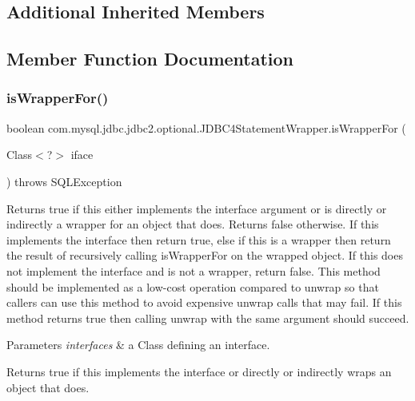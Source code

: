 \subsection*{Additional Inherited Members}


\subsection{Member Function Documentation}
\mbox{\label{classcom_1_1mysql_1_1jdbc_1_1jdbc2_1_1optional_1_1_j_d_b_c4_statement_wrapper_ae546da291666eae43135d8fe88ec8213}} 
\subsubsection{\texorpdfstring{is\+Wrapper\+For()}{isWrapperFor()}}
{\footnotesize\ttfamily boolean com.\+mysql.\+jdbc.\+jdbc2.\+optional.\+J\+D\+B\+C4\+Statement\+Wrapper.\+is\+Wrapper\+For (\begin{DoxyParamCaption}\item[{Class$<$?$>$}]{iface }\end{DoxyParamCaption}) throws S\+Q\+L\+Exception}

Returns true if this either implements the interface argument or is directly or indirectly a wrapper for an object that does. Returns false otherwise. If this implements the interface then return true, else if this is a wrapper then return the result of recursively calling {\ttfamily is\+Wrapper\+For} on the wrapped object. If this does not implement the interface and is not a wrapper, return false. This method should be implemented as a low-\/cost operation compared to {\ttfamily unwrap} so that callers can use this method to avoid expensive {\ttfamily unwrap} calls that may fail. If this method returns true then calling {\ttfamily unwrap} with the same argument should succeed.


\begin{DoxyParams}{Parameters}
{\em interfaces} & a Class defining an interface. \\
\hline
\end{DoxyParams}
\begin{DoxyReturn}{Returns}
true if this implements the interface or directly or indirectly wraps an object that does. 
\end{DoxyReturn}

